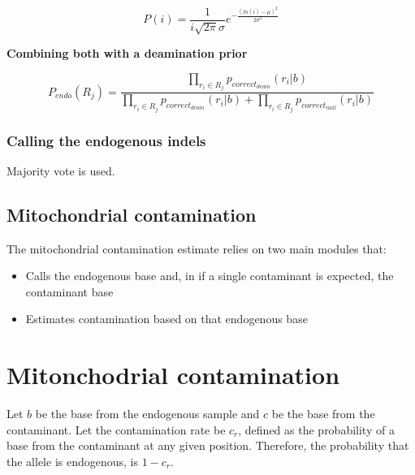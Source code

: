 \documentclass[a4paper,12pt]{article}
\begin{document}
\begin{equation}
P(i) = \frac {1} {i \sqrt{2\pi} \sigma} e^{ - \frac{(ln(i) - \mu)^2 }  {2 \sigma^2} } 
\end{equation}

{\bf Combining both with a deamination prior}


\begin{equation}
P_{endo}(R_j) = \frac { \prod\limits_{r_i \in R_j} p_{correct_{deam}}(r_i|b) } { \prod\limits_{r_i \in R_j} p_{correct_{deam}}(r_i|b) + \prod\limits_{r_i \in R_j} p_{correct_{null}}(r_i|b) }
\end{equation}


\subsubsection{Calling the endogenous indels}


Majority vote is used.



\subsection{Mitochondrial contamination}

The mitochondrial contamination estimate relies on two main modules that:

\begin{itemize}
\item Calls the endogenous base and, in if a single contaminant is expected, the contaminant base
\item Estimates contamination based on that endogenous base
\end{itemize}

\section{Mitonchodrial contamination}

Let $b$ be the base from the endogenous sample and $c$ be the base from the contaminant. Let the contamination rate be $c_r$, defined as the probability of a base from the contaminant at any given position. Therefore, the probability that the allele is endogenous, is $1-c_r$.
\end{document}

